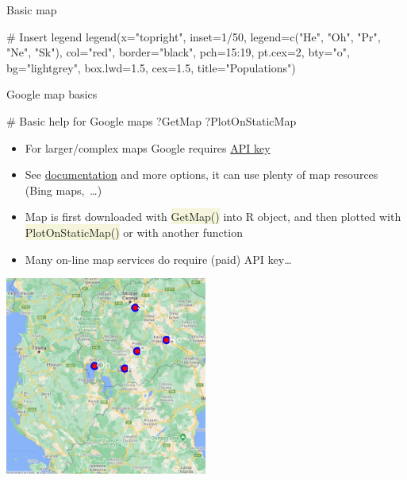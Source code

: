 \documentclass[compress, xelatex, 11pt, xcolor=svgnames, aspectratio=169,
	hyperref={
		bookmarks=true,
		unicode=true,
		colorlinks=true,
		pdftitle={Molecular data in R},
		plainpages=false,
		pdfauthor={Vojtech Zeisek},
		pdfsubject={Course about phylogeny and evolution in R},
		pdfcreator={XeLaTeX},
		pdfkeywords={R, evolution, phylogeny, molecular data},
		linkcolor=Crimson, %
		anchorcolor=Magenta, %
		citecolor=Magenta, %
		filecolor=Magenta, %
		menucolor=Magenta, %
		urlcolor=DodgerBlue, %
		},
	url={hyphens, lowtilde} %
	]{beamer}
\renewcommand{\texttt}[1]{\colorbox{Beige}{{\ttfamily #1}}}
\begin{document}
\begin{frame}[fragile]{Basic map}
	\begin{spluscode}
    # Insert legend
    legend(x="topright", inset=1/50, legend=c("He", "Oh", "Pr", "Ne", "Sk"),
      col="red", border="black", pch=15:19, pt.cex=2, bty="o", bg="lightgrey",
      box.lwd=1.5, cex=1.5, title="Populations")
	\end{spluscode}
	\begin{center}
		\texttt{[image: map.png]}
	\end{center}
\end{frame}

\begin{frame}[fragile]{Google map basics}
	\begin{multicols}{2}
		\begin{spluscode}
    # Basic help for Google maps
    ?GetMap
    ?PlotOnStaticMap
		\end{spluscode}
		\begin{itemize}
			\item For larger/complex maps Google requires \href{https://developers.google.com/maps/documentation/maps-static/overview}{API key}
			\item See \href{https://rgooglemaps.r-forge.r-project.org/}{documentation} and more options, it can use plenty of map resources (Bing maps,~\ldots)
			\item Map is first downloaded with \texttt{GetMap()} into R object, and then plotted with \texttt{PlotOnStaticMap()} or with another function
			\item Many on-line map services do require (paid) API key\ldots
		\end{itemize}
		\begin{center}
			\includegraphics[height=6.5cm]{gmap.jpg}
		\end{center}
	\end{multicols}
\end{frame}
\end{document}
